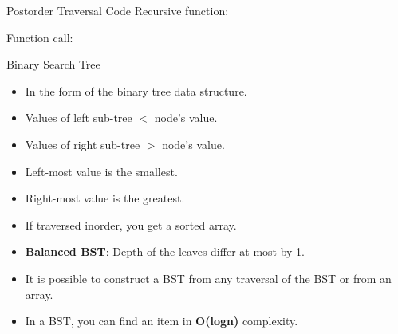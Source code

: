 \documentclass[aspectratio=169]{beamer}%
\begin{document}
\begin{frame}{Postorder Traversal Code}
    Recursive function:
    
    Function call:
    
\end{frame}

\begin{frame}{Binary Search Tree}
    \begin{itemize}
        \item In the form of the binary tree data structure.
        \item Values of left sub-tree $<$ node's value.
        \item Values of right sub-tree $>$ node's value.
        \item Left-most value is the smallest.
        \item Right-most value is the greatest.
        \item If traversed inorder, you get a sorted array.
        \item \textbf{Balanced BST}: Depth of the leaves differ at most by 1.
        \item It is possible to construct a BST from any traversal of the BST or from an array.
        \item In a BST, you can find an item in \textbf{O(logn)} complexity.
    \end{itemize}
\end{frame}
\end{document}

